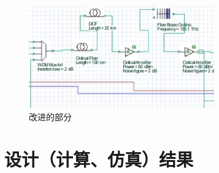 \documentclass[12pt]{article}
\begin{document}
\begin{figure}[htbp]
	\centering
	\includegraphics[width=8cm]{figure7.png}
	\caption{改进的部分}
\end{figure}
\clearpage
\section{设计（计算、仿真）结果}
\end{document}
